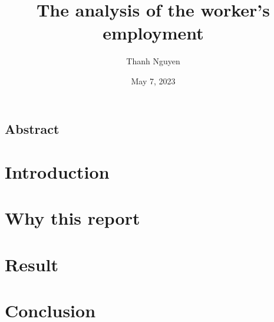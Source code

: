 \documentclass[11pt]{article}
\title{The analysis of the worker's employment}
\author{Thanh Nguyen}
\date{May 7, 2023}
\begin{document}
\maketitle

\begin{center}
    \begin{minipage}{0.85\textwidth}
        \begin{center}\section*{\normalsize Abstract}\end{center}
        \begin{footnotesize}
            \blindtext[1]
        \end{footnotesize}
    \end{minipage}
\end{center}



\begin{multicols}{2}
    \section{Introduction}
    \Blindtext[1]

    \section{Why this report}
    \Blindtext[2]

    \section{Result}
    \Blindtext[6]

    \section{Conclusion}
    \Blindtext[2]


\end{multicols}
\end{document}
